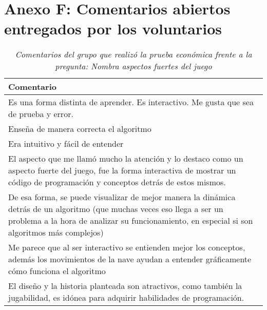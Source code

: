\chapter*{Anexo F: Comentarios abiertos entregados por los voluntarios}\label{AnexoF}



\begin{table}[h]
   \centering
   \caption*{\textit{Comentarios del grupo que realizó la prueba económica frente a la pregunta: Nombra aspectos fuertes del juego}}
   \begin{tabular}{|p{\linewidth}|}
   \hline
   \textbf{Comentario} \\\hline
   Es una forma distinta de aprender. Es interactivo. Me gusta que sea de prueba y error. \\\hline
   Enseña de manera correcta el algoritmo \\\hline
   Era intuitivo y fácil de entender \\\hline
   El aspecto que me llamó mucho la atención y lo destaco como un aspecto fuerte del juego, fue la forma interactiva de mostrar un código de programación y conceptos detrás de estos mismos. \\\hline
   
   De esa forma, se puede visualizar de mejor manera la dinámica detrás de un algoritmo (que muchas veces eso llega a ser un problema a la hora de analizar su funcionamiento, en especial si son algoritmos más complejos) \\\hline
   Me parece que al ser interactivo se entienden mejor los conceptos, además los movimientos de la nave ayudan a entender gráficamente cómo funciona el algoritmo \\\hline
   El diseño y la historia planteada son atractivos, como también la jugabilidad, es idónea para adquirir habilidades de programación. \\\hline
   

\end{tabular}
\end{table}

